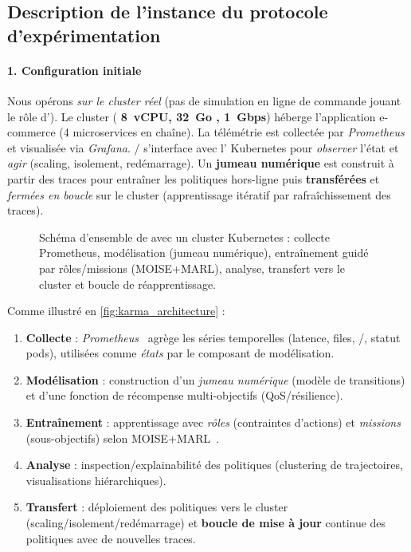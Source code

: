 \subsection{Description de l'instance du protocole d'expérimentation}

\paragraph{1. Configuration initiale}

Nous opérons \emph{sur le cluster réel} (pas de simulation en ligne de commande jouant le rôle d'). Le cluster (\textbf{ 8~vCPU, 32~Go , 1~Gbps}) héberge l'application e-commerce (4 microservices en chaîne). La télémétrie est collectée par \textit{Prometheus} et visualisée via \textit{Grafana}. / s'interface avec l' Kubernetes pour \textit{observer} l'état et \textit{agir} (scaling, isolement, redémarrage). Un \textbf{jumeau numérique} est construit à partir des traces pour entraîner les politiques hors-ligne puis \textbf{transférées} et \textit{fermées en boucle} sur le cluster (apprentissage itératif par rafraîchissement des traces).

\begin{figure}[h!]
  \centering
  \resizebox{\textwidth}{!}{%
    
  }
  \caption[Schéma d'ensemble de ]{Schéma d'ensemble de  avec un cluster Kubernetes : collecte Prometheus, modélisation (jumeau numérique), entraînement guidé par rôles/missions (MOISE+MARL), analyse, transfert vers le cluster et boucle de réapprentissage.}
  \label{fig:karma_architecture}
\end{figure}

Comme illustré en \autoref{fig:karma_architecture} :
\begin{enumerate}[label=\textbf{\arabic*)}, leftmargin=3.5mm, itemsep=2pt, topsep=2pt]
  \item \textbf{Collecte} : \textit{Prometheus}~\cite{prometheus} agrège les séries temporelles (latence, files, /, statut pods), utilisées comme \emph{états} par le composant de modélisation.
  \item \textbf{Modélisation} : construction d'un \emph{jumeau numérique} (modèle de transitions) et d'une fonction de récompense multi-objectifs (QoS/résilience).
  \item \textbf{Entraînement} : apprentissage  avec \textit{rôles} (contraintes d'actions) et \textit{missions} (sous-objectifs) selon MOISE+MARL~\cite{soule2024aomea}.
  \item \textbf{Analyse} : inspection/explainabilité des politiques (clustering de trajectoires, visualisations hiérarchiques).
  \item \textbf{Transfert} : déploiement des politiques vers le cluster (scaling/isolement/redémarrage) et \textbf{boucle de mise à jour} continue des politiques avec de nouvelles traces.
\end{enumerate}

